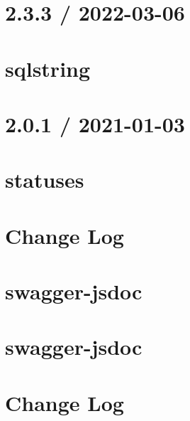 \documentclass[twoside]{book}
\newcommand{\+}{\discretionary{\mbox{\scriptsize$\hookleftarrow$}}{}{}}
\begin{document}
\chapter{2.3.3 / 2022-\/03-\/06}
\label{md_Backend_nodejs_node_modules_sqlstring_HISTORY}

\chapter{sqlstring}
\label{md_Backend_nodejs_node_modules_sqlstring_README}

\chapter{2.0.1 / 2021-\/01-\/03}
\label{md_Backend_nodejs_node_modules_statuses_HISTORY}

\chapter{statuses}
\label{md_Backend_nodejs_node_modules_statuses_README}

\chapter{Change Log}
\label{md_Backend_nodejs_node_modules_swagger_jsdoc_CHANGELOG}

\chapter{swagger-\/jsdoc}
\label{md_Backend_nodejs_node_modules_swagger_jsdoc_docusaurus_README}

\chapter{swagger-\/jsdoc}
\label{md_Backend_nodejs_node_modules_swagger_jsdoc_README}

\chapter{Change Log}
\label{md_Backend_nodejs_node_modules_swagger_parser_CHANGELOG}

\end{document}
